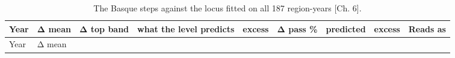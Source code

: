 \documentclass[
  10.5pt,
  a4paper,
  DIV=11,
  numbers=noendperiod]{scrartcl}
\begin{document}
\begin{longtable}[]{@{}
  >{\raggedright\arraybackslash}p{}
  >{\raggedleft\arraybackslash}p{}
  >{\raggedleft\arraybackslash}p{}
  >{\raggedleft\arraybackslash}p{}
  >{\raggedleft\arraybackslash}p{}
  >{\raggedleft\arraybackslash}p{}
  >{\raggedleft\arraybackslash}p{}
  >{\raggedleft\arraybackslash}p{}
  >{\raggedright\arraybackslash}p{}@{}}
\caption{The Basque steps against the locus fitted on all 187
region-years {[}Ch. 6{]}.}\label{tbl-b-steps}\tabularnewline
\toprule\noalign{}
\begin{minipage}[b]{\linewidth}\raggedright
Year
\end{minipage} & \begin{minipage}[b]{\linewidth}\raggedleft
Δ mean
\end{minipage} & \begin{minipage}[b]{\linewidth}\raggedleft
Δ top band
\end{minipage} & \begin{minipage}[b]{\linewidth}\raggedleft
what the level predicts
\end{minipage} & \begin{minipage}[b]{\linewidth}\raggedleft
excess
\end{minipage} & \begin{minipage}[b]{\linewidth}\raggedleft
Δ pass \%
\end{minipage} & \begin{minipage}[b]{\linewidth}\raggedleft
predicted
\end{minipage} & \begin{minipage}[b]{\linewidth}\raggedleft
excess
\end{minipage} & \begin{minipage}[b]{\linewidth}\raggedright
Reads as
\end{minipage} \\
\midrule\noalign{}
\endfirsthead
\toprule\noalign{}
\begin{minipage}[b]{\linewidth}\raggedright
Year
\end{minipage} & \begin{minipage}[b]{\linewidth}\raggedleft
Δ mean
\end{minipage} & \begin{minipage}[b]{\linewidth}\raggedleft

\end{minipage}
\end{longtable}
\end{document}
